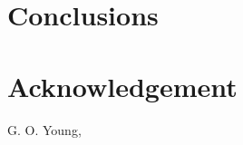 \documentclass[letterpaper, 10 pt, conference]{ieeeconf}  %
\begin{document}
\section{Conclusions}

\section{Acknowledgement}


\addtolength{\textheight}{-12cm}   %





\begin{thebibliography}{99}

 G. O. Young,


\end{thebibliography}
\end{document}
